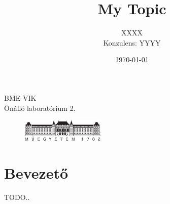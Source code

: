 \documentclass[12pt, a4paper]{article}
\author{XXXX \\ Konzulens: YYYY}
\title{\textbf{My Topic}\large}
\date{\today}
\begin{document}
\begin{doublespace}

\maketitle
\thispagestyle{empty}
\centering
\vspace*{5cm}
    BME-VIK \\
    Önálló laboratórium 2.
\end{doublespace}

\vspace*{2cm}

\begin{figure}[h]
    \centering
    \includegraphics[width=4cm]{img/bme.png}
\end{figure}

\clearpage
\tableofcontents
\clearpage

\part*{Bevezető}
TODO..
\end{document}
